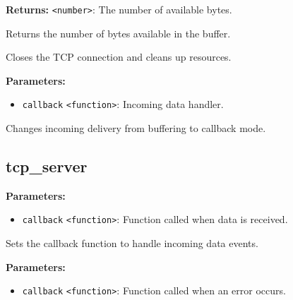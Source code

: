 \documentclass[12pt,a4paper]{article}
\begin{document}
\noindent \textbf{Returns:} \texttt{<number>}: The number of available bytes.

\noindent Returns the number of bytes available in the buffer.

\vspace{5mm}
\noindent {}


\noindent Closes the TCP connection and cleans up resources.

\vspace{5mm}
\noindent {}


\noindent \textbf{Parameters:}
\begin{itemize}
  \item \texttt{callback} \texttt{<function>}: Incoming data handler.
\end{itemize}

\noindent Changes incoming delivery from buffering to callback mode.


\subsection{tcp\_server}
\vspace{5mm}
\noindent {}


\noindent \textbf{Parameters:}
\begin{itemize}
  \item \texttt{callback} \texttt{<function>}: Function called when data is received.
\end{itemize}

\noindent Sets the callback function to handle incoming data events.

\vspace{5mm}
\noindent {}


\noindent \textbf{Parameters:}
\begin{itemize}
  \item \texttt{callback} \texttt{<function>}: Function called when an error occurs.
\end{itemize}
\end{document}
